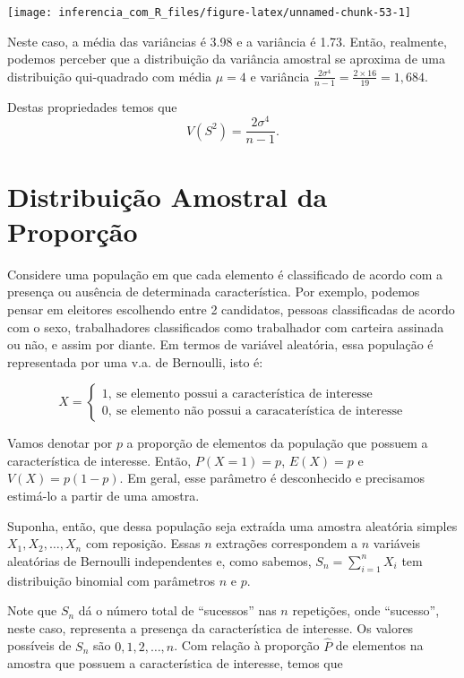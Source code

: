 \documentclass[
]{book}
\begin{document}
\begin{center}\texttt{[image: inferencia\_com\_R\_files/figure-latex/unnamed-chunk-53-1]} \end{center}

Neste caso, a média das variâncias é 3.98 e a variância é 1.73. Então, realmente, podemos perceber que a distribuição da variância amostral se aproxima de uma distribuição qui-quadrado com média \(\mu=4\) e variância \(\frac{2\sigma^4}{n-1}=\frac{2\times 16}{19}=1,684\).

Destas propriedades temos que \[V(S^2)=\frac{2\sigma^4}{n-1}.\]

\hypertarget{distribuiuxe7uxe3o-amostral-da-proporuxe7uxe3o}{%
\section{Distribuição Amostral da Proporção}\label{distribuiuxe7uxe3o-amostral-da-proporuxe7uxe3o}}

Considere uma população em que cada elemento é classificado de acordo com a presença ou ausência de determinada característica. Por exemplo, podemos pensar em eleitores escolhendo entre 2 candidatos, pessoas classificadas de acordo com o sexo, trabalhadores classificados como trabalhador com carteira assinada ou não, e assim por diante. Em termos de variável aleatória, essa população é representada por uma v.a. de Bernoulli, isto é:

\[
X=\begin{cases}
1,~\text{se elemento possui a característica de interesse}\\
0,~\text{se elemento não possui a caracaterística de interesse}
\end{cases}
\]

Vamos denotar por \(p\) a proporção de elementos da população que possuem a característica de interesse. Então, \(P(X = 1) = p\), \(E(X) = p\) e \(V(X) = p(1 -p)\). Em geral, esse parâmetro é desconhecido e precisamos estimá-lo a partir de uma amostra.

Suponha, então, que dessa população seja extraída uma amostra aleatória simples \(X_1, X_2, \ldots , X_n\) com reposição. Essas \(n\) extrações correspondem a \(n\) variáveis aleatórias de Bernoulli independentes e, como sabemos, \(S_n =\sum_{i=1}^n X_i\) tem distribuição binomial com parâmetros \(n\) e \(p\).

Note que \(S_n\) dá o número total de ``sucessos'' nas \(n\) repetições, onde ``sucesso'', neste caso, representa a presença da característica de interesse. Os valores possíveis de \(S_n\) são \(0, 1, 2,\ldots , n\). Com relação à proporção \(\hat P\) de elementos na amostra que possuem a característica de interesse, temos que
\end{document}
